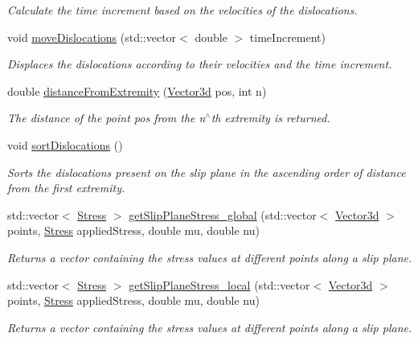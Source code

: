\begin{DoxyCompactItemize}
\begin{DoxyCompactList}\small\item\em \-Calculate the time increment based on the velocities of the dislocations. \end{DoxyCompactList}\item 
void \hyperlink{classSlipPlane_a88bc78651af7a440ab41c3d28baea5c0}{move\-Dislocations} (std\-::vector$<$ double $>$ time\-Increment)
\begin{DoxyCompactList}\small\item\em \-Displaces the dislocations according to their velocities and the time increment. \end{DoxyCompactList}\item 
double \hyperlink{classSlipPlane_a3523030cccb520b5253a811d062f3ddf}{distance\-From\-Extremity} (\hyperlink{classVector3d}{\-Vector3d} pos, int n)
\begin{DoxyCompactList}\small\item\em \-The distance of the point pos from the n$^\wedge$th extremity is returned. \end{DoxyCompactList}\item 
void \hyperlink{classSlipPlane_a7fc607c17e5532aed5e93339dc03b18d}{sort\-Dislocations} ()
\begin{DoxyCompactList}\small\item\em \-Sorts the dislocations present on the slip plane in the ascending order of distance from the first extremity. \end{DoxyCompactList}\item 
std\-::vector$<$ \hyperlink{classStress}{\-Stress} $>$ \hyperlink{classSlipPlane_a1cc47e2092a588ff04fd14e9ce9e5906}{get\-Slip\-Plane\-Stress\-\_\-global} (std\-::vector$<$ \hyperlink{classVector3d}{\-Vector3d} $>$ points, \hyperlink{classStress}{\-Stress} applied\-Stress, double mu, double nu)
\begin{DoxyCompactList}\small\item\em \-Returns a vector containing the stress values at different points along a slip plane. \end{DoxyCompactList}\item 
std\-::vector$<$ \hyperlink{classStress}{\-Stress} $>$ \hyperlink{classSlipPlane_ad86337ca356d72f558468a35024e30bc}{get\-Slip\-Plane\-Stress\-\_\-local} (std\-::vector$<$ \hyperlink{classVector3d}{\-Vector3d} $>$ points, \hyperlink{classStress}{\-Stress} applied\-Stress, double mu, double nu)
\begin{DoxyCompactList}\small\item\em \-Returns a vector containing the stress values at different points along a slip plane. \end{DoxyCompactList}\end{DoxyCompactItemize}

